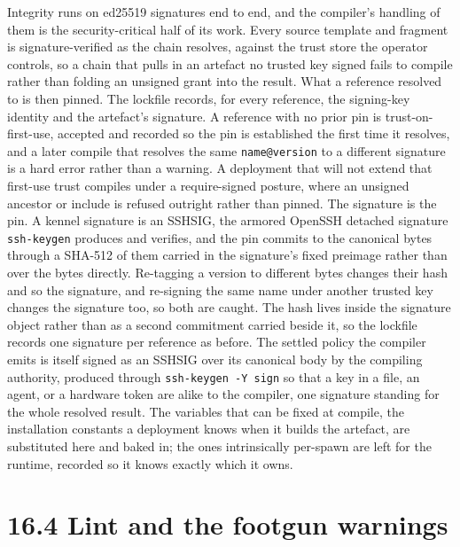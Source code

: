 Integrity runs on ed25519 signatures end to end, and the compiler's
handling of them is the security-critical half of its work. Every source
template and fragment is signature-verified as the chain resolves,
against the trust store the operator controls, so a chain that pulls in
an artefact no trusted key signed fails to compile rather than folding
an unsigned grant into the result. What a reference resolved to is then
pinned. The lockfile records, for every reference, the signing-key
identity and the artefact's signature. A reference with no prior pin is
trust-on-first-use, accepted and recorded so the pin is established the
first time it resolves, and a later compile that resolves the same
\texttt{name@version} to a different signature is a hard error rather
than a warning. A deployment that will not extend that first-use trust
compiles under a require-signed posture, where an unsigned ancestor or
include is refused outright rather than pinned. The signature is the
pin. A kennel signature is an SSHSIG, the armored OpenSSH detached
signature \texttt{ssh-keygen} produces and verifies, and the pin commits
to the canonical bytes through a SHA-512 of them carried in the
signature's fixed preimage rather than over the bytes directly.
Re-tagging a version to different bytes changes their hash and so the
signature, and re-signing the same name under another trusted key
changes the signature too, so both are caught. The hash lives inside the
signature object rather than as a second commitment carried beside it,
so the lockfile records one signature per reference as before. The
settled policy the compiler emits is itself signed as an SSHSIG over its
canonical body by the compiling authority, produced through
\texttt{ssh-keygen\ -Y\ sign} so that a key in a file, an agent, or a
hardware token are alike to the compiler, one signature standing for the
whole resolved result. The variables that can be fixed at compile, the
installation constants a deployment knows when it builds the artefact,
are substituted here and baked in; the ones intrinsically per-spawn are
left for the runtime, recorded so it knows exactly which it owns.

\hypertarget{lint-and-the-footgun-warnings}{%
\section{16.4 Lint and the footgun
warnings}\label{lint-and-the-footgun-warnings}}

